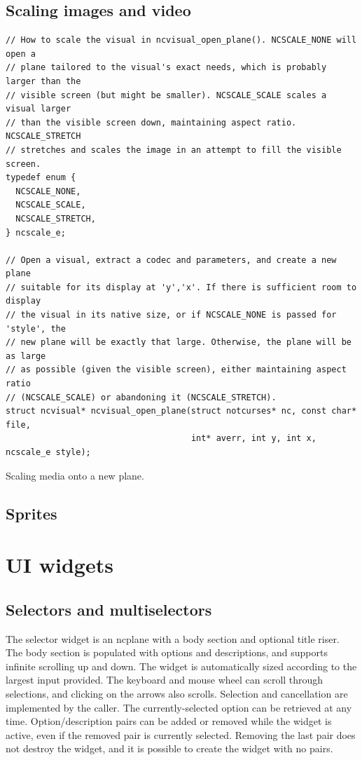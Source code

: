 \documentclass[letterpaper,10pt]{article}
\begin{document}
\subsection{Scaling images and video}
\begin{listing}[!htbp]
\begin{verbatim}
// How to scale the visual in ncvisual_open_plane(). NCSCALE_NONE will open a
// plane tailored to the visual's exact needs, which is probably larger than the
// visible screen (but might be smaller). NCSCALE_SCALE scales a visual larger
// than the visible screen down, maintaining aspect ratio. NCSCALE_STRETCH
// stretches and scales the image in an attempt to fill the visible screen.
typedef enum {
  NCSCALE_NONE,
  NCSCALE_SCALE,
  NCSCALE_STRETCH,
} ncscale_e;

// Open a visual, extract a codec and parameters, and create a new plane
// suitable for its display at 'y','x'. If there is sufficient room to display
// the visual in its native size, or if NCSCALE_NONE is passed for 'style', the
// new plane will be exactly that large. Otherwise, the plane will be as large
// as possible (given the visible screen), either maintaining aspect ratio
// (NCSCALE_SCALE) or abandoning it (NCSCALE_STRETCH).
struct ncvisual* ncvisual_open_plane(struct notcurses* nc, const char* file,
                                     int* averr, int y, int x, ncscale_e style);
\end{verbatim}
\caption{Scaling media onto a new plane.}
\label{list:scaling}
\end{listing}

\subsection{Sprites}
\newpage

\section{UI widgets}
\label{sec:uiwidgets}
\subsection{Selectors and multiselectors}

The selector widget is an ncplane with a body section and optional title riser.
The body section is populated with options and descriptions, and supports
infinite scrolling up and down. The widget is automatically sized according to
the largest input provided. The keyboard and mouse wheel can scroll through
selections, and clicking on the arrows also scrolls. Selection and cancellation
are implemented by the caller. The currently-selected option can be retrieved
at any time. Option/description pairs can be added or removed while the
widget is active, even if the removed pair is currently selected. Removing the
last pair does not destroy the widget, and it is possible to create the widget
with no pairs.
\end{document}
